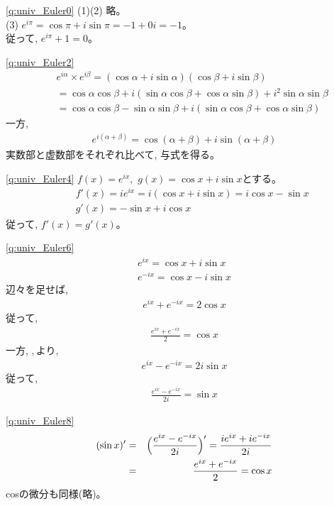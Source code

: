 \ref{q:univ_Euler0}  (1)(2) 略。\\
(3) $e^{i\pi}=\cos\pi+i\sin\pi=-1+0i=-1$。\\
従って, $e^{i\pi}+1=0$。
\mv

%
\ref{q:univ_Euler2}  
\begin{eqnarray*}
&&e^{i\alpha}\times e^{i\beta}=(\cos\alpha+i\sin\alpha)(\cos\beta+i\sin\beta)\\
&&=\cos\alpha\cos\beta+i(\sin\alpha\cos\beta+\cos\alpha\sin\beta)+i^2\sin\alpha\sin\beta\\
&&=\cos\alpha\cos\beta-\sin\alpha\sin\beta+i(\sin\alpha\cos\beta+\cos\alpha\sin\beta)
\end{eqnarray*}
一方, 
\begin{eqnarray*}e^{i(\alpha+\beta)}=\cos(\alpha+\beta)+i\sin(\alpha+\beta)\end{eqnarray*}
実数部と虚数部をそれぞれ比べて, 与式を得る。
\mv

\ref{q:univ_Euler4}  $f(x)=e^{ix},\,\, g(x)=\cos x+i\sin x$とする。
\begin{eqnarray*}
&&f'(x)=ie^{ix}=i(\cos x+i\sin x)=i\cos x-\sin x\\
&&g'(x)=-\sin x+i\cos x
\end{eqnarray*}
従って, $f'(x)=g'(x)$。
\mv

\ref{q:univ_Euler6} 
\begin{eqnarray} 
e^{ix}=\cos x + i\sin x\label{eq:euler1}\\
e^{-ix}=\cos x - i\sin x\label{eq:euler2}
\end{eqnarray}
辺々を足せば, 
\begin{eqnarray*}e^{ix}+e^{-ix}=2\cos x\end{eqnarray*}
従って, 
\begin{eqnarray} 
\frac{e^{ix}+e^{-ix}}{2}=\cos x\label{eq:coseuler}
\end{eqnarray}
一方, $, $より, 
\begin{eqnarray*}e^{ix}-e^{-ix}=2i\sin x\end{eqnarray*}
従って, 
\begin{eqnarray} 
\frac{e^{ix}-e^{-ix}}{2i}=\sin x\label{eq:sineuler}
\end{eqnarray}
\mv

\ref{q:univ_Euler8}  
\begin{eqnarray*}
(\sin x)'&=&\Bigl(\frac{e^{ix}-e^{-ix}}{2i}\Bigr)'=\frac{ie^{ix}+ie^{-ix}}{2i}\\
&=&\frac{e^{ix}+e^{-ix}}{2}=\cos x
\end{eqnarray*}
cosの微分も同様(略)。
\mv

